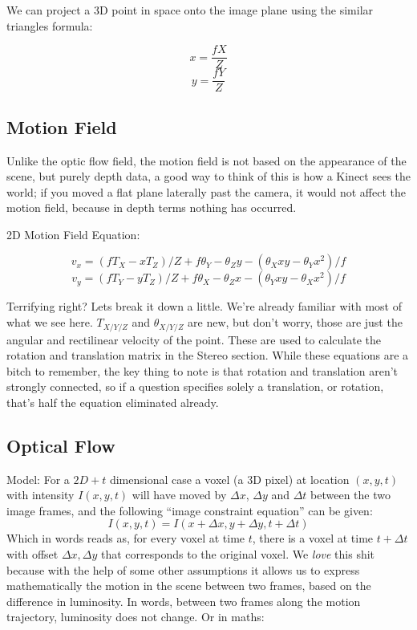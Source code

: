 \documentclass{article}
\begin{document}
        We can project a 3D point in space onto the image plane using the similar triangles formula:   
        
        $$ x = \frac{fX}{Z} $$ $$ y = \frac{fY}{Z} $$
    
    \subsection{Motion Field}
        Unlike the optic flow field, the motion field is not based on the appearance of the scene, but purely depth data, a good way to think of this is how a Kinect sees the world; if you moved a flat plane laterally past the camera, it would not affect the motion field, because in depth terms nothing has occurred. 
    
        2D Motion Field Equation:
        
        $$ v_x = (fT_X - xT_Z)/Z + f\theta _Y - \theta_Z y - (\theta_Xxy-\theta_Yx^2)/f $$
        $$ v_y = (fT_Y - yT_Z)/Z + f\theta _X - \theta_Z x - (\theta_Yxy-\theta_Xx^2)/f $$
        
        Terrifying right? Lets break it down a little. We're already familiar with most of what we see here. $T_{X/Y/Z}$ and $\theta_{X/Y/Z}$ are new, but don't worry, those are just the angular and rectilinear velocity of the point. These are used to calculate the rotation and translation matrix in the Stereo section. While these equations are a bitch to remember, the key thing to note is that rotation and translation aren't strongly connected, so if a question specifies solely a translation, or rotation, that's half the equation eliminated already.

    \subsection{Optical Flow}
        Model: For a $2D+t$ dimensional case a voxel (a 3D pixel) at location $(x,y,t)$ with intensity $I(x,y,t)$ will have moved by $\Delta x$, $\Delta y$ and $\Delta t$ between the two image frames, and the following ``image constraint equation'' can be given: 
        $$I(x,y,t) = I(x+\Delta x, y + \Delta y, t + \Delta t)$$
        Which in words reads as, for every voxel at time $t$, there is a voxel at time $t + \Delta t$ with offset $\Delta x, \Delta y$ that corresponds to the original voxel. We \emph{love} this shit because with the help of some other assumptions it allows us to express mathematically the motion in the scene between two frames, based on the difference in luminosity. In words, between two frames along the motion trajectory, luminosity does not change. Or in maths: 
            
\end{document}
